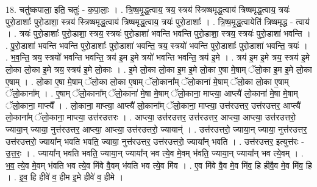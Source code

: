 \documentclass[17pt]{extarticle}
\begin{document}
18. चतु॑ष्कपाला॒ इति॒ चतुः॑ - क॒पा॒लाः॒ । . त्रि॒ष्ष॒मृ॒द्ध॒त्वाय॒ त्रय॒ स्त्रय॑ स्त्रिष्षमृद्ध॒त्वाय॑ त्रिष्षमृद्ध॒त्वाय॒ त्रयः॑ पुरो॒डाशाः᳚ पुरो॒डाशा॒ स्त्रय॑ स्त्रिष्षमृद्ध॒त्वाय॑ त्रिष्षमृद्ध॒त्वाय॒ त्रयः॑ पुरो॒डाशाः᳚ । . त्रि॒ष्ष॒मृ॒द्ध॒त्वायेति॑ त्रिष्षमृद्ध - त्वाय॑ । . त्रयः॑ पुरो॒डाशाः᳚ पुरो॒डाशा॒ स्त्रय॒ स्त्रयः॑ पुरो॒डाशा॑ भवन्ति भवन्ति पुरो॒डाशा॒ स्त्रय॒ स्त्रयः॑ पुरो॒डाशा॑ भवन्ति । . पु॒रो॒डाशा॑ भवन्ति भवन्ति पुरो॒डाशाः᳚ पुरो॒डाशा॑ भवन्ति॒ त्रय॒ स्त्रयो॑ भवन्ति पुरो॒डाशाः᳚ पुरो॒डाशा॑ भवन्ति॒ त्रयः॑ । . भ॒व॒न्ति॒ त्रय॒ स्त्रयो॑ भवन्ति भवन्ति॒ त्रय॑ इ॒म इ॒मे त्रयो॑ भवन्ति भवन्ति॒ त्रय॑ इ॒मे । . त्रय॑ इ॒म इ॒मे त्रय॒ स्त्रय॑ इ॒मे लो॒का लो॒का इ॒मे त्रय॒ स्त्रय॑ इ॒मे लो॒काः । . इ॒मे लो॒का लो॒का इ॒म इ॒मे लो॒का ए॒षा मे॒षाम् ॅलो॒का इ॒म इ॒मे लो॒का ए॒षाम् । . लो॒का ए॒षा मे॒षाम् ॅलो॒का लो॒का ए॒षाम् ॅलो॒काना᳚म् ॅलो॒काना॑ मे॒षाम् ॅलो॒का लो॒का ए॒षाम् ॅलो॒काना᳚म् । . ए॒षाम् ॅलो॒काना᳚म् ॅलो॒काना॑ मे॒षा मे॒षाम् ॅलो॒काना॒ माप्त्या॒ आप्त्यै॑ लो॒काना॑ मे॒षा मे॒षाम् ॅलो॒काना॒ माप्त्यै᳚ । . लो॒काना॒ माप्त्या॒ आप्त्यै॑ लो॒काना᳚म् ॅलो॒काना॒ माप्त्या॒ उत्त॑र‍उत्तर॒ उत्त॑र‍उत्तर॒ आप्त्यै॑ लो॒काना᳚म् ॅलो॒काना॒ माप्त्या॒ उत्त॑र‍उत्तरः । . आप्त्या॒ उत्त॑र‍उत्तर॒ उत्त॑र‍उत्तर॒ आप्त्या॒ आप्त्या॒ उत्त॑र‍उत्तरो॒ ज्याया॒न् ज्याया॒ नुत्त॑र‍उत्तर॒ आप्त्या॒ आप्त्या॒ उत्त॑र‍उत्तरो॒ ज्यायान्॑ । . उत्त॑र‍उत्तरो॒ ज्याया॒न् ज्याया॒ नुत्त॑र‍उत्तर॒ उत्त॑र‍उत्तरो॒ ज्याया᳚न् भवति भवति॒ ज्याया॒ नुत्त॑र‍उत्तर॒ उत्त॑र‍उत्तरो॒ ज्याया᳚न् भवति । . उत्त॑र‌उत्तर॒ इत्युत्त॑रः - उ॒त्त॒रः॒ । . ज्याया᳚न् भवति भवति॒ ज्याया॒न् ज्याया᳚न् भव त्ये॒व मे॒वम् भ॑वति॒ ज्याया॒न् ज्याया᳚न् भव त्ये॒वम् । . भ॒व॒ त्ये॒व मे॒वम् भ॑वति भव त्ये॒व मि॑वे वै॒वम् भ॑वति भव त्ये॒व मि॑व । . ए॒व मि॑वे वै॒व मे॒व मि॑व॒ हि हीवै॒व मे॒व मि॑व॒ हि । . इ॒व॒ हि हीवे॑ व॒ हीम इ॒मे हीवे॑ व॒ हीमे । \newline
\end{document}
